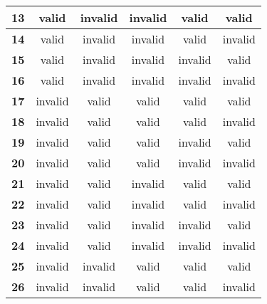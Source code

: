 \begin{table}[H]
\begin{tabular}{cccccc}
        \hline
        \textbf{13} & valid         & invalid       & invalid                    & valid                  & valid              \\
        \hline
        \textbf{14} & valid         & invalid       & invalid                    & valid                  & invalid            \\
        \hline
        \textbf{15} & valid         & invalid       & invalid                    & invalid                & valid              \\
        \hline
        \textbf{16} & valid         & invalid       & invalid                    & invalid                & invalid            \\
        \hline
        \textbf{17} & invalid       & valid         & valid                      & valid                  & valid              \\
        \hline
        \textbf{18} & invalid       & valid         & valid                      & valid                  & invalid            \\
        \hline
        \textbf{19} & invalid       & valid         & valid                      & invalid                & valid              \\
        \hline
        \textbf{20} & invalid       & valid         & valid                      & invalid                & invalid            \\
        \hline
        \textbf{21} & invalid       & valid         & invalid                    & valid                  & valid              \\
        \hline
        \textbf{22} & invalid       & valid         & invalid                    & valid                  & invalid            \\
        \hline
        \textbf{23} & invalid       & valid         & invalid                    & invalid                & valid              \\
        \hline
        \textbf{24} & invalid       & valid         & invalid                    & invalid                & invalid            \\
        \hline
        \textbf{25} & invalid       & invalid       & valid                      & valid                  & valid              \\
        \hline
        \textbf{26} & invalid       & invalid       & valid                      & valid                  & invalid            \\
        \hline

\end{tabular}
\end{table}
